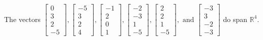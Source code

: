 \begin{exercise}
\begin{exerciseStatement}
  \end{exerciseStatement}
  \begin{exerciseAnswer}
   The vectors \(\left[\begin{array}{r}
0 \\
3 \\
2 \\
-5
\end{array}\right] , \left[\begin{array}{r}
-5 \\
3 \\
2 \\
4
\end{array}\right] , \left[\begin{array}{r}
-1 \\
2 \\
0 \\
1
\end{array}\right] , \left[\begin{array}{r}
-2 \\
-3 \\
1 \\
-5
\end{array}\right] , \left[\begin{array}{r}
2 \\
2 \\
1 \\
-5
\end{array}\right] , \text{ and } \left[\begin{array}{r}
-3 \\
3 \\
-2 \\
-3
\end{array}\right]\) 
  	 do  
	span \(\mathbb{R}^4\).
  


  \end{exerciseAnswer}
\end{exercise}
